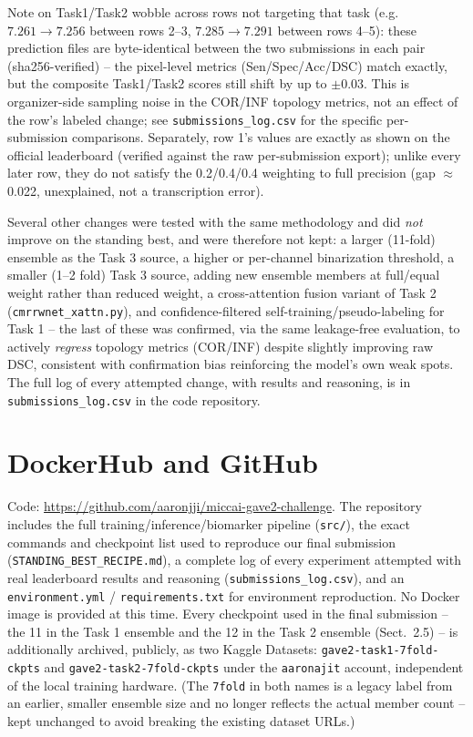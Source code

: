 \documentclass[runningheads]{llncs}
\begin{document}
Note on Task1/Task2 wobble across rows not targeting that task (e.g.\
$7.261\!\to\!7.256$ between rows 2--3, $7.285\!\to\!7.291$ between rows
4--5): these prediction files are byte-identical between the two
submissions in each pair (sha256-verified) -- the pixel-level metrics
(Sen/Spec/Acc/DSC) match exactly, but the composite Task1/Task2 scores still
shift by up to $\pm0.03$. This is organizer-side sampling noise in the
COR/INF topology metrics, not an effect of the row's labeled change; see
\texttt{submissions\_log.csv} for the specific per-submission comparisons.
Separately, row 1's values are exactly as shown on the official leaderboard
(verified against the raw per-submission export); unlike every later row,
they do not satisfy the 0.2/0.4/0.4 weighting to full precision (gap
$\approx$0.022, unexplained, not a transcription error).

Several other changes were tested with the same methodology and did
\emph{not} improve on the standing best, and were therefore not kept: a
larger (11-fold) ensemble as the Task 3 source, a higher or per-channel
binarization threshold, a smaller (1--2 fold) Task 3 source, adding new
ensemble members at full/equal weight rather than reduced weight, a
cross-attention fusion variant of Task 2 (\texttt{cmrrwnet\_xattn.py}), and
confidence-filtered self-training/pseudo-labeling for Task 1 -- the last of
these was confirmed, via the same leakage-free evaluation, to actively
\emph{regress} topology metrics (COR/INF) despite slightly improving raw
DSC, consistent with confirmation bias reinforcing the model's own weak
spots. The full log of every attempted change, with results and reasoning,
is in \texttt{submissions\_log.csv} in the code repository.

%
\section{DockerHub and GitHub}
Code: \url{https://github.com/aaronjji/miccai-gave2-challenge}. The repository
includes the full training/inference/biomarker pipeline
(\texttt{src/}), the exact commands and checkpoint list used to reproduce
our final submission (\texttt{STANDING\_BEST\_RECIPE.md}), a complete log of
every experiment attempted with real leaderboard results and reasoning
(\texttt{submissions\_log.csv}), and an \texttt{environment.yml} /
\texttt{requirements.txt} for environment reproduction. No Docker image is
provided at this time. Every checkpoint used in the final submission -- the
11 in the Task 1 ensemble and the 12 in the Task 2 ensemble (Sect.~2.5) --
is additionally archived, publicly, as two Kaggle Datasets:
\texttt{gave2-task1-7fold-ckpts} and \texttt{gave2-task2-7fold-ckpts} under
the \texttt{aaronajit} account, independent of the local training hardware.
(The \texttt{7fold} in both names is a legacy label from an earlier,
smaller ensemble size and no longer reflects the actual member count --
kept unchanged to avoid breaking the existing dataset URLs.)
\end{document}
